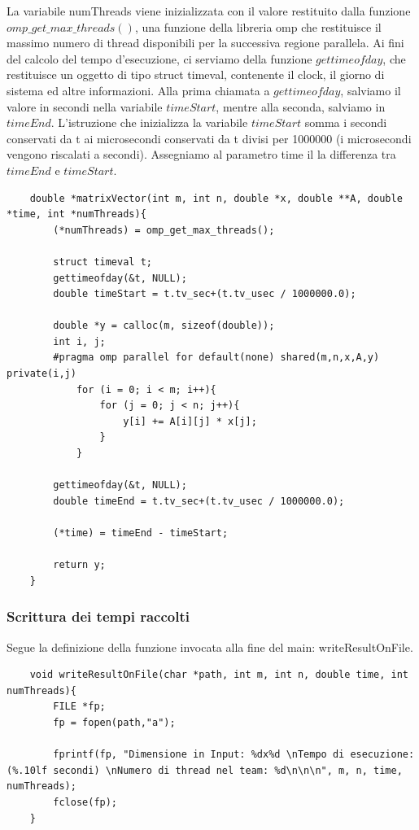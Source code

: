 La variabile numThreads viene inizializzata con il valore restituito dalla funzione $omp\_get\_max\_threads()$, una funzione della libreria omp che restituisce il massimo numero di thread disponibili per la successiva regione parallela.
Ai fini del calcolo del tempo d'esecuzione, ci serviamo della funzione $gettimeofday$, che restituisce un oggetto di tipo struct timeval, contenente il clock, il giorno di sistema ed altre informazioni.
Alla prima chiamata a $gettimeofday$, salviamo il valore in secondi nella variabile $timeStart$, mentre alla seconda, salviamo in $timeEnd$.
L'istruzione che inizializza la variabile $timeStart$ somma i secondi conservati da t ai microsecondi conservati da t divisi per 1000000 (i microsecondi vengono riscalati a secondi).
Assegniamo al parametro time il la differenza tra $timeEnd$ e $timeStart$.
\begin{lstlisting}
    double *matrixVector(int m, int n, double *x, double **A, double *time, int *numThreads){
        (*numThreads) = omp_get_max_threads();
    
        struct timeval t;
        gettimeofday(&t, NULL);
        double timeStart = t.tv_sec+(t.tv_usec / 1000000.0);

        double *y = calloc(m, sizeof(double));
        int i, j;
        #pragma omp parallel for default(none) shared(m,n,x,A,y) private(i,j)
            for (i = 0; i < m; i++){
                for (j = 0; j < n; j++){
                    y[i] += A[i][j] * x[j];
                }
            }

        gettimeofday(&t, NULL);
        double timeEnd = t.tv_sec+(t.tv_usec / 1000000.0);

        (*time) = timeEnd - timeStart;

        return y;
    }
\end{lstlisting}

\subsubsection{Scrittura dei tempi raccolti}
Segue la definizione della funzione invocata alla fine del main: writeResultOnFile.
\begin{lstlisting}
    void writeResultOnFile(char *path, int m, int n, double time, int numThreads){
        FILE *fp;
        fp = fopen(path,"a");

        fprintf(fp, "Dimensione in Input: %dx%d \nTempo di esecuzione: (%.10lf secondi) \nNumero di thread nel team: %d\n\n\n", m, n, time, numThreads);
        fclose(fp);
    }
\end{lstlisting}

